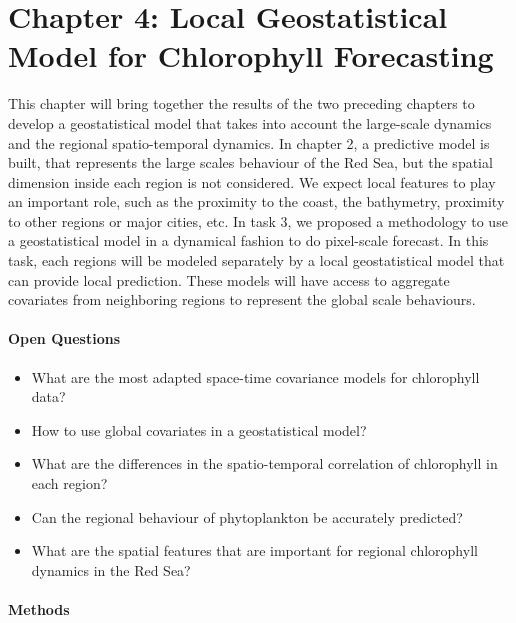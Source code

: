\section{Chapter 4: Local Geostatistical Model for Chlorophyll Forecasting}

This chapter will bring together the results of the two preceding chapters to
develop a geostatistical model that takes into account the large-scale dynamics
and the regional spatio-temporal dynamics. In chapter 2, a predictive model is
built, that represents the large scales behaviour of the Red Sea, but the
spatial dimension inside each region is not considered. We expect local
features to play an important role, such as the proximity to the coast, the
bathymetry, proximity to other regions or major cities, etc. In task 3, we
proposed a methodology to use a geostatistical model in a dynamical fashion to
do pixel-scale forecast. In this task, each regions will be modeled separately
by a local geostatistical model that can provide local prediction. These models
will have access to aggregate covariates from neighboring regions to represent
the global scale behaviours. 

\paragraph{Open Questions}

\begin{itemize}

\item What are the most adapted space-time covariance models for chlorophyll
data?

\item How to use global covariates in a geostatistical model?

\item What are the differences in the spatio-temporal correlation of
chlorophyll in each region?

\item Can the regional behaviour of phytoplankton be accurately predicted?

\item What are the spatial features that are important for regional chlorophyll
dynamics in the Red Sea?

\end{itemize}

\paragraph{Methods}

